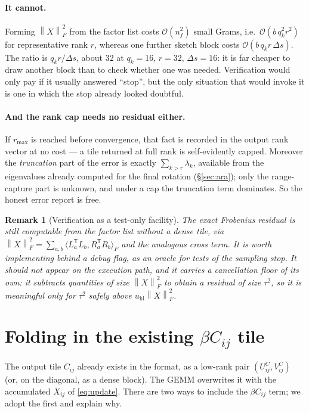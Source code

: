 \documentclass[11pt]{article}
\newtheorem{remark}{Remark}
\newcommand{\T}{\mathsf{T}}
\newcommand{\Fnorm}[1]{\left\|#1\right\|_F}
\begin{document}
\paragraph{It cannot.}
Forming $\Fnorm{X}^2$ from the factor list costs $\mathcal O(n_f^2)$ small
Grams, i.e.\ $\mathcal O(b\,q_k^2r^2)$ for representative rank $r$, whereas one
further sketch block costs $\mathcal O(b\,q_k r\,\Delta s)$. The ratio is
$q_k r/\Delta s$, about $32$ at $q_k=16$, $r=32$, $\Delta s=16$: it is far
cheaper to draw another block than to check whether one was needed. Verification
would only pay if it usually answered ``stop'', but the only situation that
would invoke it is one in which the stop already looked doubtful.

\paragraph{And the rank cap needs no residual either.}
If $r_{\max}$ is reached before convergence, that fact is recorded in the output
rank vector at no cost --- a tile returned at full rank is self-evidently
capped. Moreover the \emph{truncation} part of the error is exactly
$\sum_{k>r}\lambda_k$, available from the eigenvalues already computed for the
final rotation (\S\ref{sec:ara}); only the range-capture part is unknown, and
under a cap the truncation term dominates. So the honest error report is free.

\begin{remark}[Verification as a test-only facility]
\label{rem:verify}
The exact Frobenius residual is still computable from the factor list without a
dense tile, via $\Fnorm{X}^2=\sum_{a,b}\langle L_a^{\T}L_b,R_a^{\T}R_b\rangle_F$
and the analogous cross term. It is worth implementing behind a debug flag, as
an oracle for tests of the sampling stop. It should not appear on the execution
path, and it carries a cancellation floor of its own: it subtracts quantities of
size $\Fnorm{X}^2$ to obtain a residual of size $\tau^2$, so it is meaningful
only for $\tau^2$ safely above $u_{\mathrm{hi}}\Fnorm{X}^2$.
\end{remark}

\section{Folding in the existing \texorpdfstring{$\beta C_{ij}$}{beta C} tile}
\label{sec:beta}

The output tile $C_{ij}$ already exists in the format, as a low-rank pair
$(U^C_{ij},V^C_{ij})$ (or, on the diagonal, as a dense block). The GEMM
overwrites it with the accumulated $X_{ij}$ of \eqref{eq:update}. There are two
ways to include the $\beta C_{ij}$ term; we adopt the first and explain why.
\end{document}
